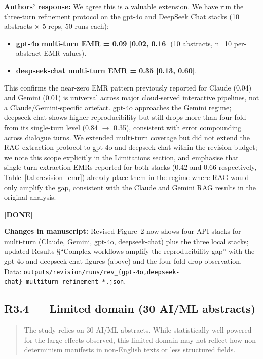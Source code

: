\documentclass[11pt,a4paper]{article}
\newenvironment{revquote}{%
  \begin{quote}\small\itshape\color{revgray}
}{%
  \end{quote}
}
\newcommand{\response}[1]{\par\noindent\textbf{\color{revgreen}Authors' response:} #1\par}
\newcommand{\changes}[1]{\par\noindent\textbf{\color{revblue}Changes in manuscript:} #1\par}
\newcommand{\done}{\color{revgreen}\textbf{[DONE]}}
\begin{document}
\response{We agree this is a valuable extension. We have run the three-turn refinement protocol on the gpt-4o and DeepSeek Chat stacks (10 abstracts $\times$ 5 reps, 50 runs each):

\begin{itemize}[leftmargin=*]
  \item \textbf{gpt-4o multi-turn EMR = 0.09 [0.02, 0.16]} (10 abstracts, n=10 per-abstract EMR values).
  \item \textbf{deepseek-chat multi-turn EMR = 0.35 [0.13, 0.60]}.
\end{itemize}

This confirms the near-zero EMR pattern previously reported for Claude (0.04) and Gemini (0.01) is universal across major cloud-served interactive pipelines, not a Claude/Gemini-specific artefact. gpt-4o approaches the Gemini regime; deepseek-chat shows higher reproducibility but still drops more than four-fold from its single-turn level (0.84 $\rightarrow$ 0.35), consistent with error compounding across dialogue turns. We extended multi-turn coverage but did not extend the RAG-extraction protocol to gpt-4o and deepseek-chat within the revision budget; we note this scope explicitly in the Limitations section, and emphasise that single-turn extraction EMRs reported for both stacks (0.42 and 0.66 respectively, Table~\ref{tab:revision_emr}) already place them in the regime where RAG would only amplify the gap, consistent with the Claude and Gemini RAG results in the original analysis.} \done

\changes{Revised Figure~2 now shows four API stacks for multi-turn (Claude, Gemini, gpt-4o, deepseek-chat) plus the three local stacks; updated Results §``Complex workflows amplify the reproducibility gap'' with the gpt-4o and deepseek-chat figures (above) and the four-fold drop observation. Data: \texttt{outputs/revision/runs/rev\_\{gpt-4o,deepseek-chat\}\_multiturn\_refinement\_*.json}.}

\subsection*{R3.4 --- Limited domain (30 AI/ML abstracts)}

\begin{revquote}
The study relies on 30 AI/ML abstracts. While statistically well-powered for the large effects observed, this limited domain may not reflect how non-determinism manifests in non-English texts or less structured fields.
\end{revquote}
\end{document}
